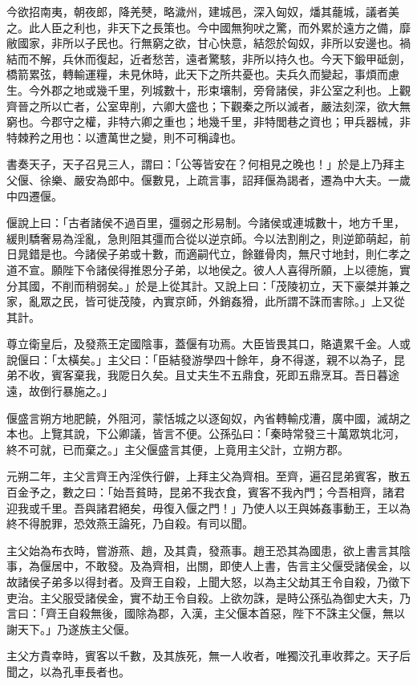 \begin{pinyinscope}
今欲招南夷，朝夜郎，降羌僰，略濊州，建城邑，深入匈奴，燔其蘢城，議者美之。此人臣之利也，非天下之長策也。今中國無狗吠之驚，而外累於遠方之備，靡敝國家，非所以子民也。行無窮之欲，甘心快意，結怨於匈奴，非所以安邊也。禍結而不解，兵休而復起，近者愁苦，遠者驚駭，非所以持久也。今天下鍛甲砥劍，橋箭累弦，轉輸運糧，未見休時，此天下之所共憂也。夫兵久而變起，事煩而慮生。今外郡之地或幾千里，列城數十，形束壤制，旁脅諸侯，非公室之利也。上觀齊晉之所以亡者，公室卑削，六卿大盛也；下觀秦之所以滅者，嚴法刻深，欲大無窮也。今郡守之權，非特六卿之重也；地幾千里，非特閭巷之資也；甲兵器械，非特棘矜之用也：以遭萬世之變，則不可稱諱也。

書奏天子，天子召見三人，謂曰：「公等皆安在？何相見之晚也！」於是上乃拜主父偃、徐樂、嚴安為郎中。偃數見，上疏言事，詔拜偃為謁者，遷為中大夫。一歲中四遷偃。

偃說上曰：「古者諸侯不過百里，彊弱之形易制。今諸侯或連城數十，地方千里，緩則驕奢易為淫亂，急則阻其彊而合從以逆京師。今以法割削之，則逆節萌起，前日晁錯是也。今諸侯子弟或十數，而適嗣代立，餘雖骨肉，無尺寸地封，則仁孝之道不宣。願陛下令諸侯得推恩分子弟，以地侯之。彼人人喜得所願，上以德施，實分其國，不削而稍弱矣。」於是上從其計。又說上曰：「茂陵初立，天下豪桀并兼之家，亂眾之民，皆可徙茂陵，內實京師，外銷姦猾，此所謂不誅而害除。」上又從其計。

尊立衛皇后，及發燕王定國陰事，蓋偃有功焉。大臣皆畏其口，賂遺累千金。人或說偃曰：「太橫矣。」主父曰：「臣結發游學四十餘年，身不得遂，親不以為子，昆弟不收，賓客棄我，我阸日久矣。且丈夫生不五鼎食，死即五鼎烹耳。吾日暮途遠，故倒行暴施之。」

偃盛言朔方地肥饒，外阻河，蒙恬城之以逐匈奴，內省轉輸戍漕，廣中國，滅胡之本也。上覽其說，下公卿議，皆言不便。公孫弘曰：「秦時常發三十萬眾筑北河，終不可就，已而棄之。」主父偃盛言其便，上竟用主父計，立朔方郡。

元朔二年，主父言齊王內淫佚行僻，上拜主父為齊相。至齊，遍召昆弟賓客，散五百金予之，數之曰：「始吾貧時，昆弟不我衣食，賓客不我內門；今吾相齊，諸君迎我或千里。吾與諸君絕矣，毋復入偃之門！」乃使人以王與姊姦事動王，王以為終不得脫罪，恐效燕王論死，乃自殺。有司以聞。

主父始為布衣時，嘗游燕、趙，及其貴，發燕事。趙王恐其為國患，欲上書言其陰事，為偃居中，不敢發。及為齊相，出關，即使人上書，告言主父偃受諸侯金，以故諸侯子弟多以得封者。及齊王自殺，上聞大怒，以為主父劫其王令自殺，乃徵下吏治。主父服受諸侯金，實不劫王令自殺。上欲勿誅，是時公孫弘為御史大夫，乃言曰：「齊王自殺無後，國除為郡，入漢，主父偃本首惡，陛下不誅主父偃，無以謝天下。」乃遂族主父偃。

主父方貴幸時，賓客以千數，及其族死，無一人收者，唯獨洨孔車收葬之。天子后聞之，以為孔車長者也。


\end{pinyinscope}
